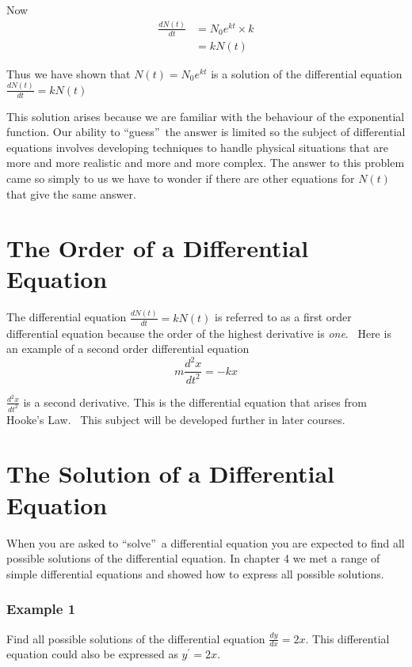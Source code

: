 Now
\begin{align*}\frac{d N (t)}{d t} &    = N_{0} e^{k t} \times k \\
 &    = k N (t)\end{align*}

Thus we have shown that $N (t) =N_{0} e^{k t}$ is a solution of the differential equation $\frac{d N (t)}{d t} =k N (t)$ 

This solution arises because we are familiar with the behaviour of the exponential function.  Our
ability to ``guess''\ the answer is limited so the subject of differential equations involves developing
techniques to handle physical situations that are more and more realistic and more and more complex.  The answer
to this problem came so simply to us we have to wonder if there are other equations for $N (t)$ that give the same answer. 

\section{The Order of a Differential Equation}
The differential equation $\frac{d N (t)}{d t} =k N (t)$ is referred to as a first order differential equation because the order of the highest derivative is \emph{one}.
\ Here is an example of a second order differential equation
\begin{equation*}m \frac{d^{2} x}{d t^{2}} = -k x
\end{equation*}

$\frac{d^{2} x}{d t^{2}}$ is a second derivative.  This is the differential equation that arises from Hooke's Law.
\ This subject will be developed further in later courses. 

\section{The Solution of a Differential Equation}
When you are asked to ``solve''\ a differential equation you are expected to find all possible
solutions of the differential equation.  In chapter 4 we met a range of simple differential equations and showed
how to express all possible solutions. 

\subsubsection{Example 1}
Find all possible solutions of the differential equation $\frac{d y}{d x} =2 x\text{.}$  This differential equation could also be expressed as $y^{ \prime } =2 x\text{.}$ 


